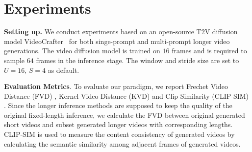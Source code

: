 \section{Experiments}
\label{experisment}

\noindent\textbf{Setting up.} We conduct experiments based on an open-source T2V diffusion model VideoCrafter~\citep{chen2023videocrafter1} for both singe-prompt and multi-prompt longer video generations. The video diffusion model is trained on $16$ frames and is required to sample $64$ frames in the inference stage. The window and stride size are set to $U=16$, $S=4$ as default.

\noindent\textbf{Evaluation Metrics}. To evaluate our paradigm, we report Frechet Video Distance (FVD) \citep{unterthiner2018towards}, Kernel Video Distance (KVD) \citep{kvd} and Clip Similarity (CLIP-SIM) \citep{radford2021learning}. Since the longer inference methods are supposed to keep the quality of the original fixed-length inference, we calculate the FVD between original generated short videos and subset generated longer videos with corresponding lengths. CLIP-SIM is used to measure the content consistency of generated videos by calculating the semantic similarity among adjacent frames of generated videos.
%


\begin{table}[t]
\caption{Quantitative comparison on longer video generation.}\vspace{-0.5em}
\label{tbl:score}
\begin{center}
\vspace{-1.0em}
\end{center}
\end{table}

